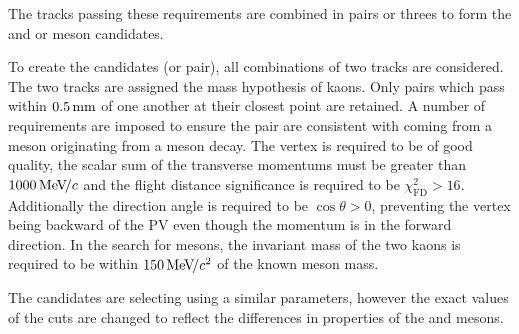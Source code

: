 The tracks passing these requirements are combined in pairs or threes to form the \Dsp and \phiz or \Dzb meson candidates.  

To create the \phiz candidates (or \Kp\Km pair), all combinations of two tracks are considered. The two tracks are assigned the mass hypothesis of kaons. Only pairs which pass within $0.5\mathrm{ \,mm}$ of one another at their closest point are retained. A number of requirements are imposed to ensure the pair are consistent with coming from a \phiz meson originating from a \Bp meson decay. The vertex is required to be of good quality, the scalar sum of the transverse momentums must be greater than $1000{\mathrm{\,Me\kern -0.1em V\!/}c}$ and the flight distance significance is required to be $\chi^{2}_{\text{FD} } > 16$. Additionally the direction angle is required to be $\cos{\theta}>0$, preventing the vertex being backward of the PV even though the momentum is in the forward direction. In the search for \decay{\Bp}{\Dsp\phiz} mesons, the invariant mass of the two kaons is required to be within $150{\mathrm{\,Me\kern -0.1em V\!/}c^2}$ of the known \phiz meson mass.  

The \Dzb candidates are selecting using a similar parameters, however the exact values of the cuts are changed to reflect the differences in properties of the \phiz and \Dzb mesons.





